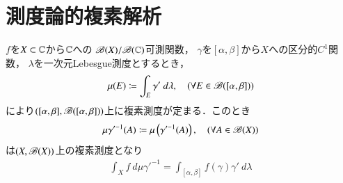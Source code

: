 \section{測度論的複素解析}
	$f$を$X \subset \mathbb{C}$から$\mathbb{C}$への
	$\mathscr{B}(X)/\mathscr{B}(\mathbb{C})$可測関数，
	$\gamma$を$[\alpha,\beta]$から$X$への区分的$C^1$関数，
	$\lambda$を一次元Lebesgue測度とするとき，
	\begin{align}
		\mu(E) \coloneqq \int_E \gamma'\ d\lambda,
		\quad (\forall E \in \mathscr{B}([\alpha,\beta]))
	\end{align}
	により$([\alpha,\beta],\mathscr{B}([\alpha,\beta]))$上に複素測度が定まる．このとき
	\begin{align}
		\mu \gamma'^{-1}(A) \coloneqq \mu\left( \gamma'^{-1}(A) \right),
		\quad (\forall A \in \mathscr{B}(X))
	\end{align}
	は$(X,\mathscr{B}(X))$上の複素測度となり
	\begin{align}
		\int_X f\ d\mu \gamma'^{-1} = \int_{[\alpha,\beta]} f(\gamma) \gamma'\ d\lambda
	\end{align}